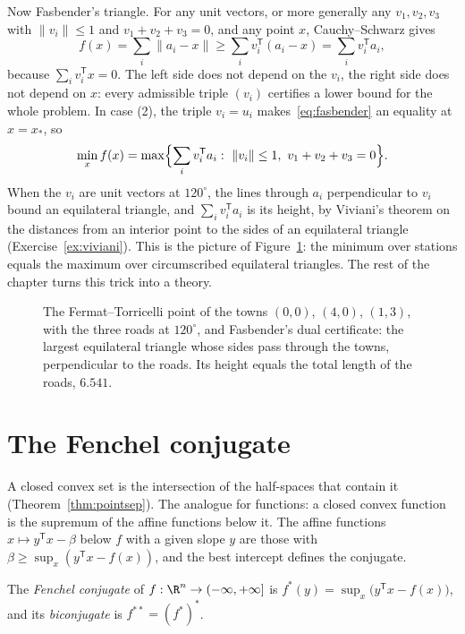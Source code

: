 Now Fasbender's triangle. For any unit vectors, or more generally any $v_1,v_2,v_3$ with $\|v_i\|\le1$ and $v_1+v_2+v_3=0$, and any point $x$, Cauchy--Schwarz gives
\begin{equation}\label{eq:fasbender}
f(x)=\sum_i\|a_i-x\|\ge\sum_iv_i^{\mathsf T}(a_i-x)=\sum_iv_i^{\mathsf T}a_i,
\end{equation}
because $\sum_iv_i^{\mathsf T}x=0$. The left side does not depend on the $v_i$, the right side does not depend on $x$: every admissible triple $(v_i)$ certifies a lower bound for the
whole problem. In case (2), the triple $v_i=u_i$ makes~\eqref{eq:fasbender} an equality at $x=x_*$, so
\[
\min_x f(x)=\max\Bigl\{\sum_iv_i^{\mathsf T}a_i:\ \|v_i\|\le1,\ v_1+v_2+v_3=0\Bigr\}.
\]
When the $v_i$ are unit vectors at $120^\circ$, the lines through $a_i$ perpendicular to $v_i$ bound an equilateral triangle, and $\sum_iv_i^{\mathsf T}a_i$ is its height, by Viviani's
theorem on the distances from an interior point to the sides of an equilateral triangle (Exercise~\ref{ex:viviani}). This is the picture of Figure~\ref{fig:fermat}: the
minimum over stations equals the maximum over circumscribed equilateral triangles. The rest of the chapter turns this trick into a theory.

\begin{figure}[ht]
\centering
{}
\caption{The Fermat--Torricelli point of the towns $(0,0)$, $(4,0)$, $(1,3)$, with the three roads at $120^\circ$, and Fasbender's dual certificate: the largest equilateral
triangle whose sides pass through the towns, perpendicular to the roads. Its height equals the total length of the roads, $6.541$.}
\label{fig:fermat}
\end{figure}

\section{The Fenchel conjugate}\label{sec:conjugate}

A closed convex set is the intersection of the half-spaces that contain it (Theorem~\ref{thm:pointsep}). The analogue for functions: a closed convex function is the supremum
of the affine functions below it. The affine functions $x\mapsto y^{\mathsf T}x-\beta$ below $f$ with a given slope $y$ are those with $\beta\ge\sup_x(y^{\mathsf T}x-f(x))$, and the best
intercept defines the conjugate.

\begin{definition}\label{def:conjugate}
The \emph{Fenchel conjugate} of $f:\R^n\to(-\infty,+\infty]$ is $f^*(y)=\sup_x\bigl(y^{\mathsf T}x-f(x)\bigr)$, and its \emph{biconjugate} is $f^{**}=(f^*)^*$.
\end{definition}

